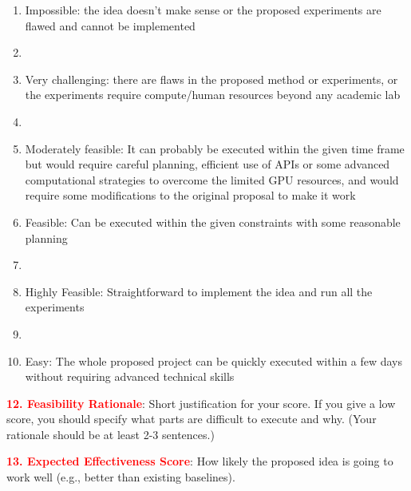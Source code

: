 \begin{enumerate}
    \item Impossible: the idea doesn't make sense or the proposed experiments are flawed and cannot be implemented
    \item 
    \item Very challenging: there are flaws in the proposed method or experiments, or the experiments require compute/human resources beyond any academic lab
    \item 
    \item Moderately feasible: It can probably be executed within the given time frame but would require careful planning, efficient use of APIs or some advanced computational strategies to overcome the limited GPU resources, and would require some modifications to the original proposal to make it work
    \item Feasible: Can be executed within the given constraints with some reasonable planning
    \item 
    \item Highly Feasible: Straightforward to implement the idea and run all the experiments
    \item 
    \item Easy: The whole proposed project can be quickly executed within a few days without requiring advanced technical skills
\end{enumerate}

\textbf{\textcolor{red}{12. Feasibility Rationale}}: Short justification for your score. If you give a low score, you should specify what parts are difficult to execute and why. (Your rationale should be at least 2-3 sentences.)



\textbf{\textcolor{red}{13. Expected Effectiveness Score}}: How likely the proposed idea is going to work well (e.g., better than existing baselines).

